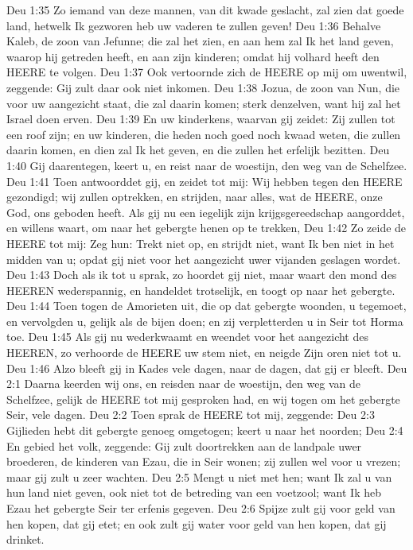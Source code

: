 Deu 1:35  Zo iemand van deze mannen, van dit kwade geslacht, zal zien dat goede land, hetwelk Ik gezworen heb uw vaderen te zullen geven!
Deu 1:36  Behalve Kaleb, de zoon van Jefunne; die zal het zien, en aan hem zal Ik het land geven, waarop hij getreden heeft, en aan zijn kinderen; omdat hij volhard heeft den HEERE te volgen.
Deu 1:37  Ook vertoornde zich de HEERE op mij om uwentwil, zeggende: Gij zult daar ook niet inkomen.
Deu 1:38  Jozua, de zoon van Nun, die voor uw aangezicht staat, die zal daarin komen; sterk denzelven, want hij zal het Israel doen erven.
Deu 1:39  En uw kinderkens, waarvan gij zeidet: Zij zullen tot een roof zijn; en uw kinderen, die heden noch goed noch kwaad weten, die zullen daarin komen, en dien zal Ik het geven, en die zullen het erfelijk bezitten.
Deu 1:40  Gij daarentegen, keert u, en reist naar de woestijn, den weg van de Schelfzee.
Deu 1:41  Toen antwoorddet gij, en zeidet tot mij: Wij hebben tegen den HEERE gezondigd; wij zullen optrekken, en strijden, naar alles, wat de HEERE, onze God, ons geboden heeft. Als gij nu een iegelijk zijn krijgsgereedschap aangorddet, en willens waart, om naar het gebergte henen op te trekken,
Deu 1:42  Zo zeide de HEERE tot mij: Zeg hun: Trekt niet op, en strijdt niet, want Ik ben niet in het midden van u; opdat gij niet voor het aangezicht uwer vijanden geslagen wordet.
Deu 1:43  Doch als ik tot u sprak, zo hoordet gij niet, maar waart den mond des HEEREN wederspannig, en handeldet trotselijk, en toogt op naar het gebergte.
Deu 1:44  Toen togen de Amorieten uit, die op dat gebergte woonden, u tegemoet, en vervolgden u, gelijk als de bijen doen; en zij verpletterden u in Seir tot Horma toe.
Deu 1:45  Als gij nu wederkwaamt en weendet voor het aangezicht des HEEREN, zo verhoorde de HEERE uw stem niet, en neigde Zijn oren niet tot u.
Deu 1:46  Alzo bleeft gij in Kades vele dagen, naar de dagen, dat gij er bleeft.
Deu 2:1  Daarna keerden wij ons, en reisden naar de woestijn, den weg van de Schelfzee, gelijk de HEERE tot mij gesproken had, en wij togen om het gebergte Seir, vele dagen.
Deu 2:2  Toen sprak de HEERE tot mij, zeggende:
Deu 2:3  Gijlieden hebt dit gebergte genoeg omgetogen; keert u naar het noorden;
Deu 2:4  En gebied het volk, zeggende: Gij zult doortrekken aan de landpale uwer broederen, de kinderen van Ezau, die in Seir wonen; zij zullen wel voor u vrezen; maar gij zult u zeer wachten.
Deu 2:5  Mengt u niet met hen; want Ik zal u van hun land niet geven, ook niet tot de betreding van een voetzool; want Ik heb Ezau het gebergte Seir ter erfenis gegeven.
Deu 2:6  Spijze zult gij voor geld van hen kopen, dat gij etet; en ook zult gij water voor geld van hen kopen, dat gij drinket.
